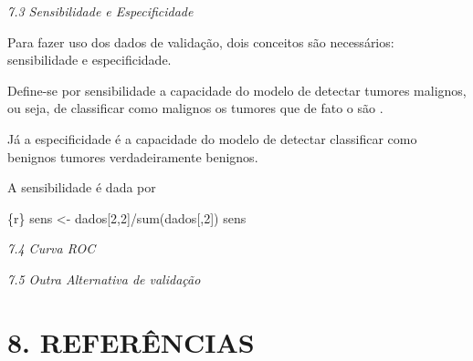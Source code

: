 \documentclass[]{article}
\begin{document}
\emph{7.3 Sensibilidade e Especificidade}

Para fazer uso dos dados de validação, dois conceitos são necessários:
sensibilidade e especificidade.

Define-se por sensibilidade a capacidade do modelo de detectar tumores
malignos, ou seja, de classificar como malignos os tumores que de fato o
são .

Já a especificidade é a capacidade do modelo de detectar classificar
como benignos tumores verdadeiramente benignos.

A sensibilidade é dada por

\{r\} sens \textless{}- dados{[}2,2{]}/sum(dados{[},2{]}) sens

\emph{7.4 Curva ROC}

\emph{7.5 Outra Alternativa de validação}

\hypertarget{referencias}{%
\section{8. REFERÊNCIAS}\label{referencias}}
\end{document}
